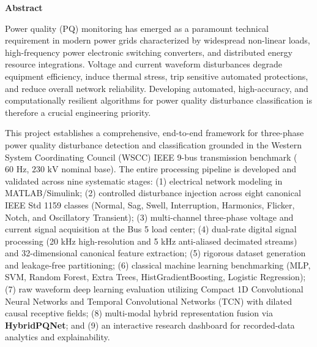 \documentclass[12pt,a4paper]{report}
\begin{document}
\begin{center}
    \vspace*{1.5cm}
    \textbf{\LARGE Abstract}\\[1.5cm]
\end{center}
Power quality (PQ) monitoring has emerged as a paramount technical requirement in modern power grids characterized by widespread non-linear loads, high-frequency power electronic switching converters, and distributed energy resource integrations. Voltage and current waveform disturbances degrade equipment efficiency, induce thermal stress, trip sensitive automated protections, and reduce overall network reliability. Developing automated, high-accuracy, and computationally resilient algorithms for power quality disturbance classification is therefore a crucial engineering priority.

This project establishes a comprehensive, end-to-end framework for three-phase power quality disturbance detection and classification grounded in the Western System Coordinating Council (WSCC) IEEE 9-bus transmission benchmark ($60\text{ Hz}$, $230\text{ kV}$ nominal base). The entire processing pipeline is developed and validated across nine systematic stages:
(1) electrical network modeling in MATLAB/Simulink;
(2) controlled disturbance injection across eight canonical IEEE Std 1159 classes (Normal, Sag, Swell, Interruption, Harmonics, Flicker, Notch, and Oscillatory Transient);
(3) multi-channel three-phase voltage and current signal acquisition at the Bus 5 load center;
(4) dual-rate digital signal processing (20 kHz high-resolution and 5 kHz anti-aliased decimated streams) and 32-dimensional canonical feature extraction;
(5) rigorous dataset generation and leakage-free partitioning;
(6) classical machine learning benchmarking (MLP, SVM, Random Forest, Extra Trees, HistGradientBoosting, Logistic Regression);
(7) raw waveform deep learning evaluation utilizing Compact 1D Convolutional Neural Networks and Temporal Convolutional Networks (TCN) with dilated causal receptive fields;
(8) multi-modal hybrid representation fusion via \textbf{HybridPQNet}; and
(9) an interactive research dashboard for recorded-data analytics and explainability.
\end{document}
